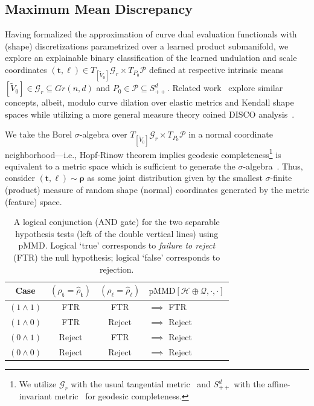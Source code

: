 \documentclass[pdflatex,iicol]{sn-jnl}%
\theoremstyle{thmstyleone}%
\theoremstyle{thmstyletwo}%
\theoremstyle{thmstylethree}%
\begin{document}
\subsection{Maximum Mean Discrepancy} \label{subsec:MMD}
Having formalized the approximation of curve dual evaluation functionals with (shape) discretizations parametrized over a learned product submanifold, we explore an explainable binary classification of the learned undulation and scale coordinates $(\boldsymbol{t},\boldsymbol{\ell}) \in T_{[\widetilde{V}_0]}\mathcal{G}_r \times T_{P_0}\mathcal{P}$ defined at respective intrinsic means $[\widetilde{V}_0] \in \mathcal{G}_r\subseteq Gr(n,d)$ and $P_0 \in \mathcal{P}\subseteq S^d_{++}$. Related work~\cite{zhang2022nonparametric} explore similar concepts, albeit, modulo curve dilation over elastic metrics and Kendall shape spaces while utilizing a more general measure theory coined DISCO analysis~\cite{RizzoDISCO2010}. 

We take the Borel $\sigma$-algebra over $T_{[\widetilde{V}_0]}\mathcal{G}_r \times T_{P_0}\mathcal{P}$ in a normal coordinate neighborhood---i.e., Hopf-Rinow theorem implies geodesic completeness\footnote{We utilize $\mathcal{G}_r$ with the usual tangential metric~\cite{edelman1998geometry,bendokat2020grassmann} and $S^d_{++}$ with the affine-invariant metric~\cite{fletcher2003statistics,pennec2020manifold} for geodesic completeness.} is equivalent to a metric space which is sufficient to generate the $\sigma$-algebra~\cite{pennec1999probabilities}. Thus, consider $(\boldsymbol{t}, \boldsymbol{\ell}) \sim \boldsymbol{\rho}$ as some joint distribution given by the smallest $\sigma$-finite (product) measure of random shape (normal) coordinates generated by the metric (feature) space.

\begin{table}
    \centering
    \begin{tabular}{c|c|c||l}
        {Case} &
        $(\rho_{\boldsymbol{t}}=\widehat{\rho}_{\boldsymbol{t}})$ &
        $(\rho_{\boldsymbol{\ell}}=\widehat{\rho}_{\boldsymbol{\ell}})$ & $\text{pMMD}[\mathcal{H} \oplus \mathcal{Q},\cdot,\cdot]$ \\
        \hline
        $(1 \wedge 1)$ &
        FTR & FTR & $\implies$ FTR\\
        $(1 \wedge 0)$ &
        FTR & Reject & $\implies$ Reject \\
        $(0 \wedge 1)$ &
        Reject & FTR & $\implies$ Reject \\
        $(0 \wedge 0)$ &
        Reject & Reject & $\implies$ Reject \\
    \end{tabular}
    \caption{A logical conjunction (AND gate) for the two separable hypothesis tests (left of the double vertical lines) using pMMD. Logical `true' corresponds to \emph{failure to reject} (FTR) the null hypothesis; logical `false' corresponds to rejection.}
    \label{tab:logical_conjunction}
\end{table}
\end{document}
